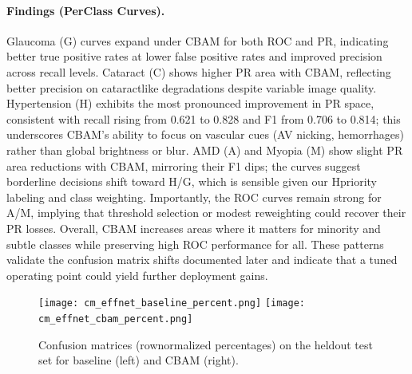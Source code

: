 \paragraph{Findings (Per\textendash Class Curves).}
Glaucoma (G) curves expand under CBAM for both ROC and PR, indicating better true positive rates at lower false positive rates and improved precision across recall levels. Cataract (C) shows higher PR area with CBAM, reflecting better precision on cataract\textendash like degradations despite variable image quality. Hypertension (H) exhibits the most pronounced improvement in PR space, consistent with recall rising from 0.621 to 0.828 and F1 from 0.706 to 0.814; this underscores CBAM’s ability to focus on vascular cues (AV nicking, hemorrhages) rather than global brightness or blur. AMD (A) and Myopia (M) show slight PR area reductions with CBAM, mirroring their F1 dips; the curves suggest borderline decisions shift toward H/G, which is sensible given our H\textendash priority labeling and class weighting. Importantly, the ROC curves remain strong for A/M, implying that threshold selection or modest re\textendash weighting could recover their PR losses. Overall, CBAM increases areas where it matters for minority and subtle classes while preserving high ROC performance for all. These patterns validate the confusion matrix shifts documented later and indicate that a tuned operating point could yield further deployment gains.

\begin{figure}[H]
  \centering
  \texttt{[image: cm\_effnet\_baseline\_percent.png]}
  \texttt{[image: cm\_effnet\_cbam\_percent.png]}
  \caption{Confusion matrices (row\textendash normalized percentages) on the held\textendash out test set for baseline (left) and CBAM (right).}
  \label{fig:cms}
\end{figure}

